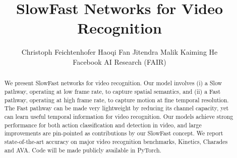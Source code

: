 \documentclass[10pt,twocolumn,letterpaper]{article}
\begin{document}
	
	
	\title{\vspace{-.5em} SlowFast Networks for Video Recognition \\ \vspace{-.5em}}
	
	\author{
		Christoph Feichtenhofer \qquad
		Haoqi Fan \qquad
		Jitendra Malik \qquad
		Kaiming He \vspace{.8em}\\
		Facebook AI Research (FAIR)
	}
	
	\maketitle
	
	\newcommand{\fastcolor}[1]{\textcolor{fastcolor}{\textbf{#1}}}
	\newcommand{\fastcolorC}[1]{\textcolor{orange}{#1}}
	\newcommand{\slowcolor}[1]{\textcolor{slowcolor}{#1}}
	
	\newcommand{\slow}{\slowcolor{Slow }}
	\newcommand{\fast}{\fastcolor{Fast }}
	
	\newcommand{\predictioncolor}[1]{\textcolor{predictioncolor}{#1}}
	\newcommand{\labelcolor}[1]{\textcolor{labelcolor}{#1}}
	
	\newcommand{\pred}{\predictioncolor{\textbf{Predictions}: }}
	\newcommand{\gt}{\labelcolor{\textbf{Labels}: }}
	
	
	\newcommand{\demph}[1]{\textcolor{demphcolor}{#1}}
	
	
	\begin{abstract}
		\vspace{-.5em}
		We present SlowFast networks for video recognition. Our model involves (i) a Slow pathway, operating at low frame rate, to capture spatial semantics, and (ii) a Fast pathway, operating at high frame rate, to capture motion at fine temporal resolution. The Fast pathway can be made very lightweight by reducing its channel capacity, yet can learn useful temporal information for video recognition.
		Our models achieve strong performance for both action classification and detection in video, and large improvements are pin-pointed as contributions by our SlowFast concept. 
		We report state-of-the-art accuracy on major video recognition benchmarks, Kinetics, Charades and AVA. Code will be made publicly available in PyTorch.
	\end{abstract}
	
\end{document}
